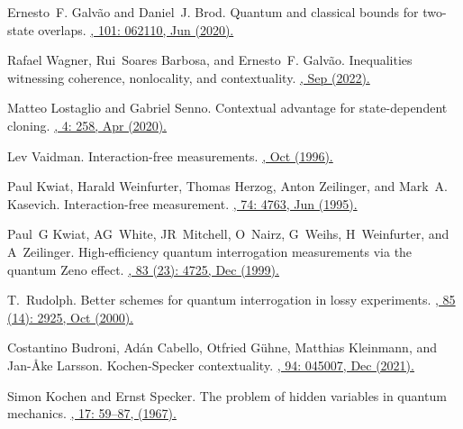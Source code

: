\documentclass[letterpaper,onecolumn,12pt,accepted=2024-01-17]{article}
\begin{document}
\begin{thebibliography}{100}
Ernesto~F. Galv\~ao and Daniel~J. Brod.
\newblock Quantum and classical bounds for two-state overlaps.
\href{https://doi.org/10.1103/PhysRevA.101.062110}{, 101: 062110, Jun (2020).}

Rafael Wagner, Rui~Soares Barbosa, and Ernesto~F. Galv\~{a}o.
\newblock Inequalities witnessing coherence, nonlocality, and contextuality.
\href{https://doi.org/10.48550/arXiv.2209.02670}{, Sep (2022).}

Matteo Lostaglio and Gabriel Senno.
\newblock Contextual advantage for state-dependent cloning.
\href{https://doi.org/10.22331/q-2020-04-27-258}{, 4: 258, Apr (2020).}

Lev Vaidman.
\newblock Interaction-free measurements.
\href{https://doi.org/10.48550/arXiv.quant-ph/9610033}{, Oct (1996).}

Paul Kwiat, Harald Weinfurter, Thomas Herzog, Anton Zeilinger, and Mark~A.
  Kasevich.
\newblock Interaction-free measurement.
\href{https://doi.org/10.1103/PhysRevLett.74.4763}{, 74: 4763, Jun (1995).}

Paul~G Kwiat, AG~White, JR~Mitchell, O~Nairz, G~Weihs, H~Weinfurter, and  A~Zeilinger.
\newblock High-efficiency quantum interrogation measurements via the quantum  {Z}eno effect.
\href{https://doi.org/10.1103/PhysRevLett.83.4725}{, 83 (23): 4725, Dec (1999).}

T.~Rudolph.
\newblock Better schemes for quantum interrogation in lossy experiments.
\href{https://doi.org/10.1103/PhysRevLett.85.2925}{, 85 (14): 2925, Oct (2000).}

Costantino Budroni, Ad{\'a}n Cabello, Otfried G{\"u}hne, Matthias Kleinmann,
  and Jan-{\AA}ke Larsson.
\newblock Kochen-{S}pecker contextuality.
\href{https://doi.org/10.1103/RevModPhys.94.045007}{, 94: 045007, Dec (2021).}

Simon Kochen and Ernst Specker.
\newblock The problem of hidden variables in quantum mechanics.
\href{https://doi.org/10.1007/978-3-0348-9259-9_21}{, 17: 59--87, (1967).}


\end{thebibliography}
\end{document}
